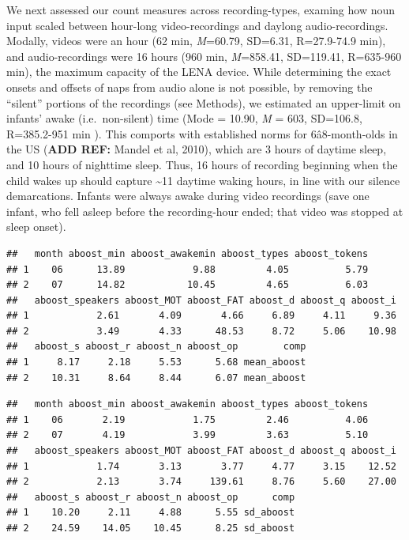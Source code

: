 \documentclass[man]{apa6}
\theoremstyle{definition}
\theoremstyle{definition}
\theoremstyle{definition}
\theoremstyle{remark}
\begin{document}
We next assessed our count measures across recording-types, examing how
noun input scaled between hour-long video-recordings and daylong
audio-recordings. Modally, videos were an hour (62 min, \emph{M}=60.79,
SD=6.31, R=27.9-74.9 min), and audio-recordings were 16 hours (960 min,
\emph{M}=858.41, SD=119.41, R=635-960 min), the maximum capacity of the
LENA device. While determining the exact onsets and offsets of naps from
audio alone is not possible, by removing the \enquote{silent} portions
of the recordings (see Methods), we estimated an upper-limit on infants'
awake (i.e.~non-silent) time (Mode = 10.90, \emph{M} = 603, SD=106.8,
R=385.2-951 min ). This comports with established norms for
6â8-month-olds in the US (\textbf{ADD REF:} Mandel et al, 2010), which
are 3 hours of daytime sleep, and 10 hours of nighttime sleep. Thus, 16
hours of recording beginning when the child wakes up should capture
\textasciitilde{}11 daytime waking hours, in line with our silence
demarcations. Infants were always awake during video recordings (save
one infant, who fell asleep before the recording-hour ended; that video
was stopped at sleep onset).

\begin{verbatim}
##   month aboost_min aboost_awakemin aboost_types aboost_tokens
## 1    06      13.89            9.88         4.05          5.79
## 2    07      14.82           10.45         4.65          6.03
##   aboost_speakers aboost_MOT aboost_FAT aboost_d aboost_q aboost_i
## 1            2.61       4.09       4.66     6.89     4.11     9.36
## 2            3.49       4.33      48.53     8.72     5.06    10.98
##   aboost_s aboost_r aboost_n aboost_op        comp
## 1     8.17     2.18     5.53      5.68 mean_aboost
## 2    10.31     8.64     8.44      6.07 mean_aboost
\end{verbatim}

\begin{verbatim}
##   month aboost_min aboost_awakemin aboost_types aboost_tokens
## 1    06       2.19            1.75         2.46          4.06
## 2    07       4.19            3.99         3.63          5.10
##   aboost_speakers aboost_MOT aboost_FAT aboost_d aboost_q aboost_i
## 1            1.74       3.13       3.77     4.77     3.15    12.52
## 2            2.13       3.74     139.61     8.76     5.60    27.00
##   aboost_s aboost_r aboost_n aboost_op      comp
## 1    10.20     2.11     4.88      5.55 sd_aboost
## 2    24.59    14.05    10.45      8.25 sd_aboost
\end{verbatim}
\end{document}
